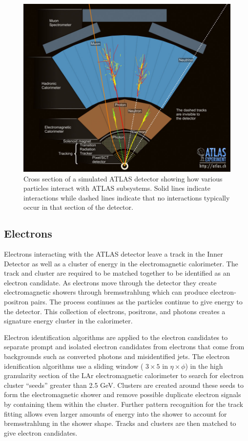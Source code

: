 \begin{figure}[h]
	\centering
	\includegraphics[width=\columnwidth]{../ThesisImages/Simulation/ParticleInteractions.jpg}
	\caption[Cross section of a simulated ATLAS detector showing how various particles interact with ATLAS subsystems.]{Cross section of a simulated ATLAS detector showing how various particles interact with ATLAS subsystems.  Solid lines indicate interactions while dashed lines indicate that no interactions typically occur in that section of the detector. \cite{ParticleInteractions} 
	}
	\label{fig:ATLASInteractions}
\end{figure}


\subsection{Electrons}
Electrons interacting with the ATLAS detector leave a track in the Inner Detector as well as a cluster of energy in the electromagnetic calorimeter.  The track and cluster are required to be matched together to be identified as an electron candidate\cite{ElectronID}.  As electrons move through the detector they create electromagnetic showers through bremsstrahlung which can produce electron-positron pairs.  The process continues as the particles continue to give energy to the detector.  This collection of electrons, positrons, and photons creates a signature energy cluster in the calorimeter.  

Electron identification algorithms are applied to the electron candidates to separate prompt and isolated electron candidates from electrons that come from backgrounds such as converted photons and misidentified jets.  The electron idenification algorithms use a sliding window ( $3\times5$ in $\eta \times \phi$) in the high granularity section of the LAr electromagnetic calorimeter to search for electron cluster ``seeds'' greater than 2.5 GeV.  Clusters are created around these seeds to form the electromagnetic shower and remove possible duplicate electron signals by containing them within the cluster.  Further pattern recognition for the track fitting allows even larger amounts of energy into the shower to account for bremsstrahlung in the shower shape.  Tracks and clusters are then matched to give electron candidates.  

